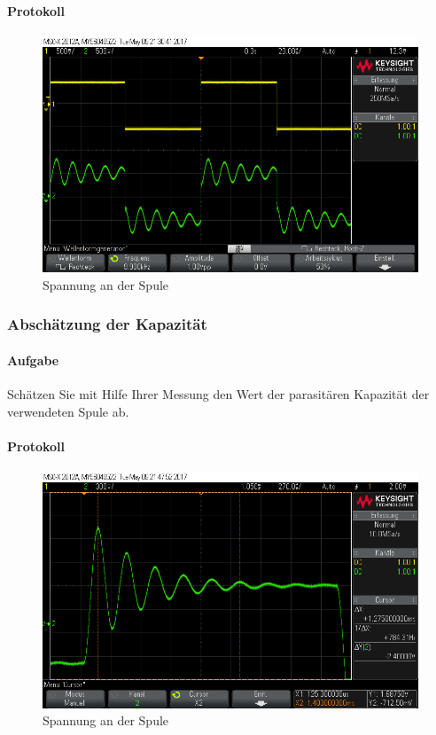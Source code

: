 \documentclass[10pt]{scrreprt}
\begin{document}
        \paragraph{Protokoll}
        \begin{center}
            \begin{figure}[H]
                \includegraphics[width=\textwidth]{scope_8.png}
                \caption{Spannung an der Spule}
            \end{figure}
        \end{center}

        \subsubsection{Abschätzung der Kapazität}
        \paragraph{Aufgabe}
        Schätzen Sie mit Hilfe Ihrer Messung den Wert der parasitären Kapazität der
        verwendeten Spule ab.

        \paragraph{Protokoll}
        \begin{center}
            \begin{figure}[H]
                \includegraphics[width=\textwidth]{scope_11.png}
                \caption{Spannung an der Spule}
            \end{figure}
        \end{center}
\end{document}

